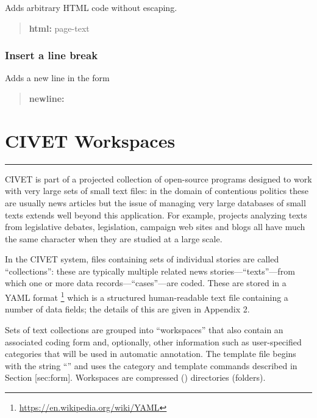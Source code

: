 \documentclass[letterpaper,10pt,english]{sphinxmanual}
\begin{document}
Adds arbitrary HTML code without escaping.
\begin{quote}

\begin{DUlineblock}{0em}
\item[] \textbf{html:} page-text
\end{DUlineblock}
\end{quote}


\subsection{Insert a line break}
\label{forms:insert-a-line-break}
Adds a new line in the form
\begin{quote}

\textbf{newline:}
\end{quote}


\chapter{CIVET Workspaces}
\label{workspaces:civet-workspaces}\label{workspaces::doc}

\bigskip\hrule{}\bigskip


CIVET is part of a projected collection of open-source programs designed
to work with very large sets of small text files: in the domain of
contentious politics these are usually news articles but the issue of
managing very large databases of small texts extends well beyond this
application. For example, projects analyzing texts from legislative
debates, legislation, campaign web sites and blogs all have much the
same character when they are studied at a large scale.

In the CIVET system, files containing sets of individual stories are
called “collections”: these are typically multiple related news
stories—“texts”—from which one or more data records—“cases”—are coded.
These are stored in a YAML format \footnote{
\href{https://en.wikipedia.org/wiki/YAML}{https://en.wikipedia.org/wiki/YAML}
} which is a structured
human-readable text file containing a number of data fields; the details
of this are given in Appendix 2.

Sets of text collections are grouped into “workspaces” that also contain
an associated coding form and, optionally, other information such as
user-specified categories that will be used in automatic annotation. The
template file begins with the string “” and uses the category
and template commands described in Section {[}sec:form{]}. Workspaces are
compressed () directories (folders).
\end{document}
